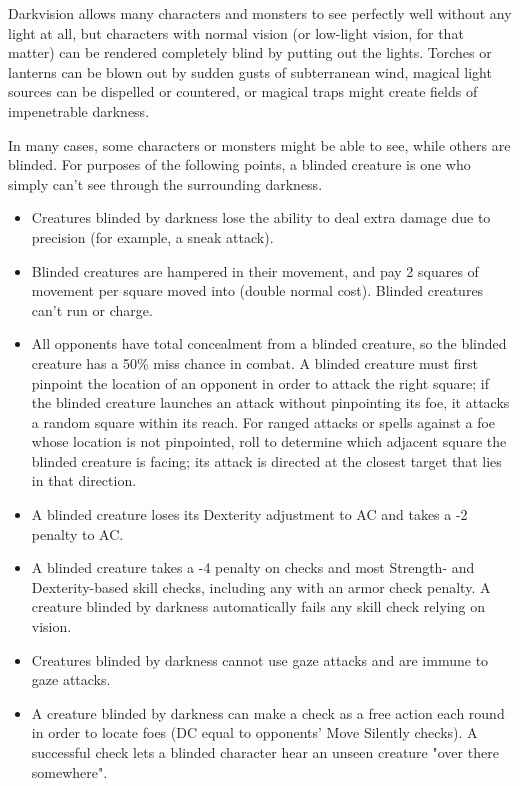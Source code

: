 Darkvision allows many characters and monsters to see perfectly well without any 
light at all, but characters with normal vision (or low-light vision, for that 
matter) can be rendered completely blind by putting out the lights. Torches or 
lanterns can be blown out by sudden gusts of subterranean wind, magical light sources 
can be dispelled or countered, or magical traps might create fields of impenetrable 
darkness.

In many cases, some characters or monsters might be able to see, while others are 
blinded. For purposes of the following points, a blinded creature is one who simply 
can't see through the surrounding darkness.

\begin{itemize}
\item Creatures blinded by darkness lose the ability to deal extra damage due to precision (for example, a sneak attack).
\item Blinded creatures are hampered in their movement, and pay 2 squares of movement 
per square moved into (double normal cost). Blinded creatures can't run or charge.
\item All opponents have total concealment from a blinded creature, so the blinded creature 
has a 50\% miss chance in combat. A blinded creature must first pinpoint the location 
of an opponent in order to attack the right square; if the blinded creature launches 
an attack without pinpointing its foe, it attacks a random square within its reach. 
For ranged attacks or spells against a foe whose location is not pinpointed, roll 
to determine which adjacent square the blinded creature is facing; its attack is 
directed at the closest target that lies in that direction.
\item A blinded creature loses its Dexterity adjustment to AC and takes a -2 penalty to AC.
\item A blinded creature takes a -4 penalty on  checks and most Strength- and Dexterity-based 
skill checks, including any with an armor check penalty. A creature blinded by 
darkness automatically fails any skill check relying on vision.
\item Creatures blinded by darkness cannot use gaze attacks and are immune to gaze attacks.
\item A creature blinded by darkness can make a  check as a free action each round 
in order to locate foes (DC equal to opponents' Move Silently checks). A successful 
check lets a blinded character hear an unseen creature "over there somewhere".

\end{itemize}
